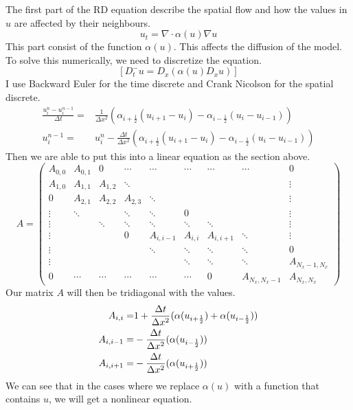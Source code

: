 \documentclass{article}
\begin{document}
The first part of the RD equation describe the spatial flow and how the values in $u$ are
affected by their neighbours.  
\begin{equation}
	u_t = \nabla \cdot \alpha(u)\nabla u
\end{equation}
This part consist of the function $\alpha(u)$. This
affects the diffusion of the model. 
To solve this numerically, we need to discretize the equation.
\begin{equation*}
	\left[D_t^-u=D_x(\alpha(u) D_x u)\right]
\end{equation*}
I use Backward Euler for the time discrete and Crank Nicolson for the spatial
discrete. 
\begin{align*}
	\frac{u^n_i-u^{n-1}_i}{\Delta t}=& \frac{1}{\Delta x^2}\left(\alpha_{i+\frac{1}{2}}(u_{i+1}-u_i)-\alpha_{i-\frac{1}{2}}(u_{i}-u_{i-1})\right)\\
	u^{n-1}_i=&u^n_i- \frac{\Delta t}{\Delta x^2}\left(\alpha_{i+\frac{1}{2}}(u_{i+1}-u_i)-\alpha_{i-\frac{1}{2}}(u_{i}-u_{i-1})\right)
\end{align*}
Then we are able to put this into a linear equation as the section above. 
\begin{equation}
A =
\left(
\begin{array}{cccccccccc}
A_{0,0} & A_{0,1} & 0
&\cdots &
\cdots & \cdots & \cdots &
\cdots & 0 \\
A_{1,0} & A_{1,1} & A_{1,2} & \ddots &   & &  & &  \vdots \\
0 & A_{2,1} & A_{2,2} & A_{2,3} &
\ddots & &  &  & \vdots \\
\vdots & \ddots &  & \ddots & \ddots & 0 &  & & \vdots \\
\vdots &  & \ddots & \ddots & \ddots & \ddots & \ddots & & \vdots \\
\vdots & &  & 0 & A_{i,i-1} & A_{i,i} & A_{i,i+1} & \ddots & \vdots \\
\vdots & & &  & \ddots & \ddots & \ddots &\ddots  & 0 \\
\vdots & & & &  &\ddots  & \ddots &\ddots  & A_{N_x-1,N_x} \\
0 &\cdots & \cdots &\cdots & \cdots & \cdots  & 0 & A_{N_x,N_x-1} & A_{N_x,N_x}
\end{array}
\right)
\tag{14}
\end{equation}
Our matrix $A$ will then be tridiagonal with the values.
\begin{align} \label{eq:matrix_spatial}
A_{i,i} =& 1+\frac{\Delta t}{\Delta x^2}(\alpha(u_{i+\frac{1}{2}})+\alpha(u_{i-\frac{1}{2}}))\notag\\
A_{i,i-1} =&-\frac{\Delta t}{\Delta x^2}(\alpha(u_{i-\frac{1}{2}}))\notag\\
A_{i,i+1} =&-\frac{\Delta t}{\Delta x^2}(\alpha(u_{i+\frac{1}{2}}))
\end{align}                               
We can see that in the cases where we replace
$\alpha(u)$ with a function that contains $u$, we will get a nonlinear equation.
\end{document}

